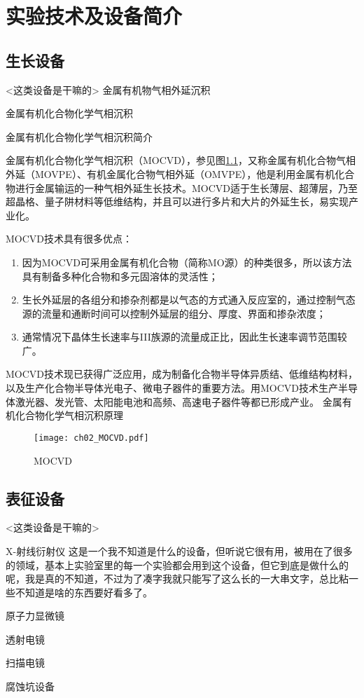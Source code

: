 % 

\chapter{实验技术及设备简介}
\section{生长设备}
<这类设备是干嘛的>
金属有机物气相外延沉积

{\hei 金属有机化合物化学气相沉积}

金属有机化合物化学气相沉积简介

金属有机化合物化学气相沉积（MOCVD），参见图\ref{fig:mocvd}，又称金属有机化合物气相外延（MOVPE）、有机金属化合物气相外延（OMVPE），他是利用金属有机化合物进行金属输运的一种气相外延生长技术。MOCVD适于生长薄层、超薄层，乃至超晶格、量子阱材料等低维结构，并且可以进行多片和大片的外延生长，易实现产业化。

MOCVD技术具有很多优点：
\begin{enumerate}[(1)]
\item 因为MOCVD可采用金属有机化合物（简称MO源）的种类很多，所以该方法具有制备多种化合物和多元固溶体的灵活性；
\item 生长外延层的各组分和掺杂剂都是以气态的方式通入反应室的，通过控制气态源的流量和通断时间可以控制外延层的组分、厚度、界面和掺杂浓度；
\item 通常情况下晶体生长速率与III族源的流量成正比，因此生长速率调节范围较广。
\end{enumerate}

MOCVD技术现已获得广泛应用，成为制备化合物半导体异质结、低维结构材料，以及生产化合物半导体光电子、微电子器件的重要方法。用MOCVD技术生产半导体激光器、发光管、太阳能电池和高频、高速电子器件等都已形成产业。
金属有机化合物化学气相沉积原理

\begin{figure}[h]
	\centering
	\texttt{[image: ch02\_MOCVD.pdf]}
	\caption{MOCVD}
	\label{fig:mocvd}
\end{figure}

\section{表征设备}

<这类设备是干嘛的>

{\hei X-射线衍射仪} 这是一个我不知道是什么的设备，但听说它很有用，被用在了很多的领域，基本上实验室里的每一个实验都会用到这个设备，但它到底是做什么的呢，我是真的不知道，不过为了凑字我就只能写了这么长的一大串文字，总比粘一些不知道是啥的东西要好看多了。

{\hei 原子力显微镜}

{\hei 透射电镜}

{\hei 扫描电镜}

{\hei 腐蚀坑设备}

\ifx\usechapbib\empty


\fi

